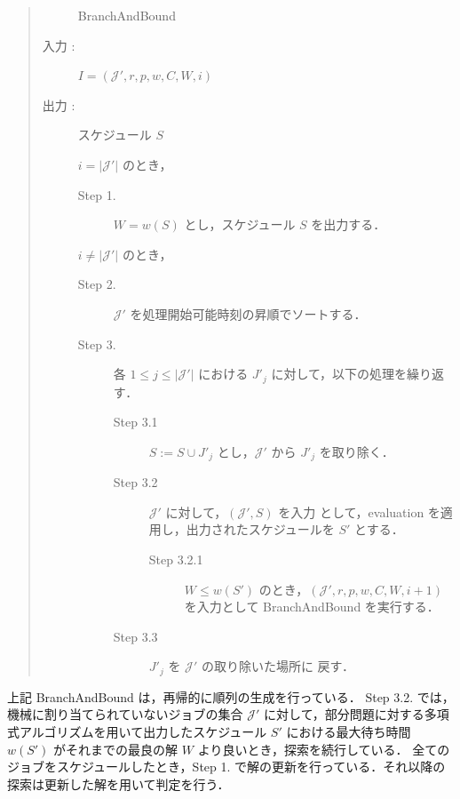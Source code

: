 \documentclass[12pt]{optlab-bachelor}
\begin{document}
\begin{quote}
  \begin{description}
    \item[] {\sc BranchAndBound}
    \item[入力 :] $I = (\mathcal{J}',r,p,w,C,W,i)$
    \item[出力 :] スケジュール $S$
  \end{description}
  \begin{description}
    \item[] $i = |\mathcal{J}'|$ のとき，
    \begin{description}
      \item[Step 1.] $W = w(S)$ とし，スケジュール $S$ を出力する．
    \end{description}
    \item[] $i \neq |\mathcal{J}'|$ のとき，
    \begin{description}
      \item[Step 2.] $\mathcal{J}'$ を処理開始可能時刻の昇順でソートする．
      \item[Step 3.] 各 $1 \le j \le |\mathcal{J}'|$ における $J'_j$ に対して，以下の処理を繰り返す．
      \begin{description}
        \item[Step 3.1] $S := S \cup J'_j$ とし，$\mathcal{J}'$ から $J'_j$ を取り除く．
        \item[Step 3.2] $\mathcal{J}'$ に対して，$(\mathcal{J}',S)$ を入力
        として，{\sc evaluation} を適用し，出力されたスケジュールを $S'$ とする．
        \begin{description}
          \item[Step 3.2.1] $W \le w(S')$ のとき，$(\mathcal{J}',r,p,w,C,W,i + 1)$ を入力として {\sc BranchAndBound} を実行する．
        \end{description}
        \item[Step 3.3] $J'_j$ を $\mathcal{J}'$ の取り除いた場所に
        戻す．
      \end{description}
    \end{description}
  \end{description}
\end{quote}

上記 {\sc BranchAndBound} は，再帰的に順列の生成を行っている．
Step 3.2. では，機械に割り当てられていないジョブの集合 $\mathcal{J}'$ に対して，部分問題に対する多項式アルゴリズムを用いて出力したスケジュール $S'$ における最大待ち時間 $w(S')$ がそれまでの最良の解 $W$ より良いとき，探索を続行している．
全てのジョブをスケジュールしたとき，Step 1. で解の更新を行っている．それ以降の探索は更新した解を用いて判定を行う．
\end{document}
